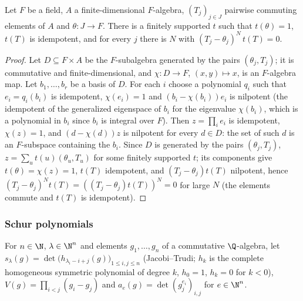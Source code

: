 \begin{lemma}\label{pf:geo:projone}
Let $F$ be a field, $A$ a finite-dimensional $F$-algebra, $(T_j)_{j\in J}$ pairwise commuting elements of $A$ and
$\theta\colon J\to F$. There is a finitely supported $t$ such that $t(\theta)=1$, $t(T)$ is idempotent, and for every
$j$ there is $N$ with $(T_j-\theta_j)^N\,t(T)=0$.
\end{lemma}

\begin{proof}
Let $D\subseteq F\times A$ be the $F$-subalgebra generated by the pairs $(\theta_j,T_j)$; it is commutative and
finite-dimensional, and $\chi\colon D\to F$, $(x,y)\mapsto x$, is an $F$-algebra map. Let $b_1,\dots,b_r$ be a basis of $D$.
For each $i$ choose a polynomial $q_i$ such that $e_i=q_i(b_i)$ is idempotent, $\chi(e_i)=1$ and
$(b_i-\chi(b_i))e_i$ is nilpotent (the idempotent of the generalized eigenspace of $b_i$ for the eigenvalue
$\chi(b_i)$, which is a polynomial in $b_i$ since $b_i$ is integral over $F$). Then $z=\prod_ie_i$ is idempotent,
$\chi(z)=1$, and $(d-\chi(d))z$ is nilpotent for every $d\in D$: the set of such $d$ is an $F$-subspace containing
the $b_i$. Since $D$ is generated by the pairs $(\theta_j,T_j)$, $z=\sum_ut(u)(\theta_u,T_u)$ for some finitely supported
$t$; its components give $t(\theta)=\chi(z)=1$, $t(T)$ idempotent, and $(T_j-\theta_j)t(T)$ nilpotent, hence
$(T_j-\theta_j)^Nt(T)=((T_j-\theta_j)t(T))^N=0$ for large $N$ (the elements commute and $t(T)$ is idempotent).
\end{proof}

\subsubsection{Schur polynomials}

For $n\in\N$, $\lambda\in\N^n$ and elements $g_1,\dots,g_n$ of a commutative $\Q$-algebra, let
$s_\lambda(g)=\det\bigl(h_{\lambda_i-i+j}(g)\bigr)_{1\le i,j\le n}$ (Jacobi--Trudi; $h_k$ is the complete homogeneous
symmetric polynomial of degree $k$, $h_0=1$, $h_k=0$ for $k<0$), $V(g)=\prod_{i<j}(g_i-g_j)$ and
$a_e(g)=\det(g_j^{e_i})_{i,j}$ for $e\in\N^n$.

